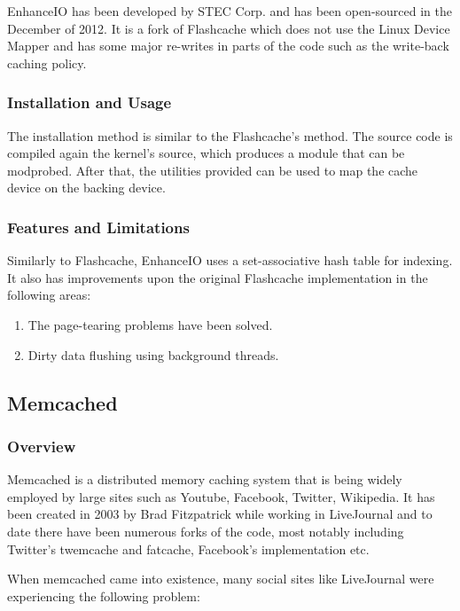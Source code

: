 EnhanceIO has been developed by STEC Corp. and has been open-sourced in the 
December of 2012. It is a fork of Flashcache which does not use the Linux 
Device Mapper and has some major re-writes in parts of the code such as the 
write-back caching policy.

\subsubsection{Installation and Usage}

The installation method is similar to the Flashcache's method. The source code 
is compiled again the kernel's source, which produces a module that can be 
modprobed. After that, the utilities provided can be used to map the cache 
device on the backing device.

\subsubsection{Features and Limitations}

Similarly to Flashcache, EnhanceIO uses a set-associative hash table for 
indexing. It also has improvements upon the original Flashcache implementation 
in the following areas:

\begin{enumerate}
	\item The page-tearing problems have been solved.
	\item Dirty data flushing using background threads.
\end{enumerate}

\subsection{Memcached}\label{sec:memcached-triad}

\subsubsection{Overview}

Memcached is a distributed memory caching system that is being widely employed 
by large sites such as Youtube, Facebook, Twitter, Wikipedia. It has been 
created in 2003 by Brad Fitzpatrick while working in LiveJournal and to date 
there have been numerous forks of the code, most notably including Twitter's 
twemcache and fatcache, Facebook's implementation etc.

When memcached came into existence, many social sites like LiveJournal were 
experiencing the following problem:


